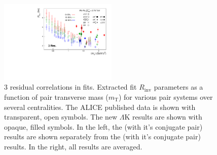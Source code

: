 \documentclass[/home/jesse/Analysis/FemtoAnalysis/AnalysisNotes/AnalysisNoteJBuxton.tex]{subfiles}
\begin{document}
\begin{figure}[h]
  \centering
  \includegraphics[width=0.5\textwidth]{7_ResultsAndDiscussion/Figures/mTscaling_MinvCalc_OutlinedPoints_OthersTransparent_wJaiAndHans_3Res.pdf}
  \caption[$m_{\mathrm{T}}$ Scaling of Radii: 3 Residuals in Fit]{3 residual correlations in \LamK fits.  Extracted fit $R_{\mathrm{inv}}$ parameters as a function of pair transverse mass ($m_{\mathrm{T}}$) for various pair systems over several centralities. The ALICE published data \cite{Adam:2015vja} is shown with transparent, open symbols.  The new $\Lambda$K results are shown with opaque, filled symbols.  In the left, the \LamKchP (with it's conjugate pair) results are shown separately from the \LamKchM (with it's conjugate pair) results.  In the right, all \LamKpm results are averaged.}
  \label{fig:mTScalingOfRadii_3Res}
\end{figure}
\end{document}
